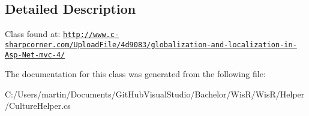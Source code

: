 \subsection{Detailed Description}
Class found at\+: \href{http://www.c-sharpcorner.com/UploadFile/4d9083/globalization-and-localization-in-Asp-Net-mvc-4/}{\tt http\+://www.\+c-\/sharpcorner.\+com/\+Upload\+File/4d9083/globalization-\/and-\/localization-\/in-\/\+Asp-\/\+Net-\/mvc-\/4/} 



The documentation for this class was generated from the following file\+:\begin{DoxyCompactItemize}
\item 
C\+:/\+Users/martin/\+Documents/\+Git\+Hub\+Visual\+Studio/\+Bachelor/\+Wis\+R/\+Wis\+R/\+Helper/Culture\+Helper.\+cs\end{DoxyCompactItemize}
